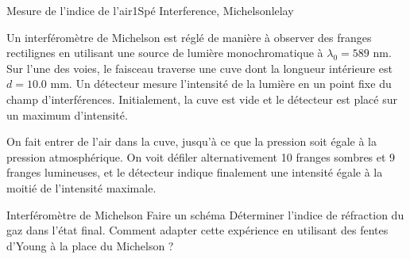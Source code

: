 \begin{exercise}{Mesure de l'indice de l'air}{1}{Spé}
{Interference, Michelson}{lelay}

Un interféromètre de Michelson est réglé de manière à observer des franges rectilignes en utilisant une source de lumière monochromatique à $\lambda_0 = 589$ nm. Sur l'une des voies, le faisceau traverse une cuve dont la longueur intérieure est $d = 10.0$ mm. Un détecteur mesure l'intensité de la lumière en un point fixe du champ d'interférences. Initialement, la cuve est vide et le détecteur est placé sur un maximum d'intensité.

On fait entrer de l'air dans la cuve, jusqu'à ce que la pression soit égale à la pression atmosphérique. On voit défiler alternativement 10 franges sombres et 9 franges lumineuses, et le détecteur indique finalement une intensité égale à la moitié de l'intensité maximale.

\begin{questions}
    \questioncours Interféromètre de Michelson
    \question Faire un schéma
    \question Déterminer l'indice de réfraction du gaz dans l'état final.
    \question Comment adapter cette expérience en utilisant des fentes d'Young à la place du Michelson ?
\end{questions}

\end{exercise}